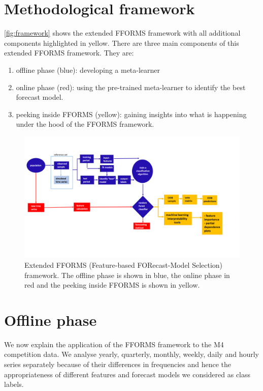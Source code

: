 \documentclass[11pt,a4paper,]{article}
\providecommand{\tightlist}{%
  \setlength{\itemsep}{0pt}\setlength{\parskip}{0pt}}
\begin{document}
\hypertarget{fforms}{%
\section{Methodological framework}\label{fforms}}

\autoref{fig:framework} shows the extended FFORMS framework with all additional components highlighted in yellow. There are three main components of this extended FFORMS framework. They are:

\begin{enumerate}
\def\labelenumi{\arabic{enumi}.}
\tightlist
\item
  offline phase (blue): developing a meta-learner
\item
  online phase (red): using the pre-trained meta-learner to identify the best forecast model.
\item
  peeking inside FFORMS (yellow): gaining insights into what is happening under the hood of the FFORMS framework.
\end{enumerate}

\begin{figure}[h]
\includegraphics[width=1.1\linewidth]{img/framework2} \caption{Extended FFORMS (Feature-based FORecast-Model Selection) framework. The offline phase is shown in blue, the online phase in red and the peeking inside FFORMS is shown in yellow.}\label{fig:framework}
\end{figure}

\hypertarget{offline}{%
\section{Offline phase}\label{offline}}

We now explain the application of the FFORMS framework to the M4 competition data. We analyse yearly, quarterly, monthly, weekly, daily and hourly series separately because of their differences in frequencies and hence the appropriateness of different features and forecast models we considered as class labels.
\end{document}
